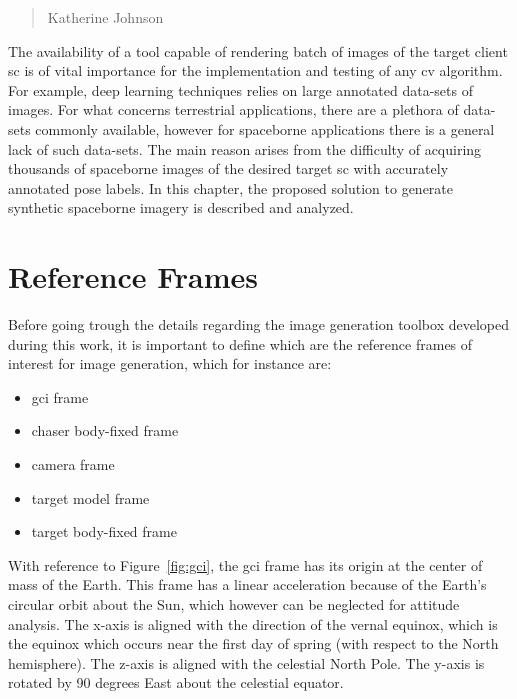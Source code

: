 \begin{quotation}
  {\footnotesize
    \begin{flushright}
      Katherine Johnson
    \end{flushright}
  }
\end{quotation}
\vspace{0.5cm}

The availability of a tool capable of rendering batch of images of the target client \acrshort{sc} is of vital importance for the implementation and testing of any \acrshort{cv} algorithm. For example, deep learning techniques relies on large annotated data-sets of images. For what concerns terrestrial applications, there are a plethora of data-sets commonly available, however for spaceborne applications there is a general lack of such data-sets. The main reason arises from the difficulty of acquiring thousands of spaceborne images of the desired target \acrshort{sc} with accurately annotated pose labels. In this chapter, the proposed solution to generate synthetic spaceborne imagery is described and analyzed.

\section{Reference Frames}\label{sec:refereceFrames}
Before going trough the details regarding the image generation toolbox developed during this work, it is important to define which are the reference frames of interest for image generation, which for instance are:

\begin{itemize}
  \item \acrfull{gci} frame
  \item chaser body-fixed frame
  \item camera frame
  \item target model frame
  \item target body-fixed frame
\end{itemize}

With reference to Figure~\ref{fig:gci}, the \acrshort{gci} frame has its origin at the center of mass of the Earth. This frame has a linear acceleration because of the Earth's circular orbit about the Sun, which however can be neglected for attitude analysis. The x-axis is aligned with the direction of the vernal equinox, which is the equinox which occurs near the first day of spring (with respect to the North hemisphere). The z-axis is aligned with the celestial North Pole. The y-axis is rotated by 90 degrees East about the celestial equator.

